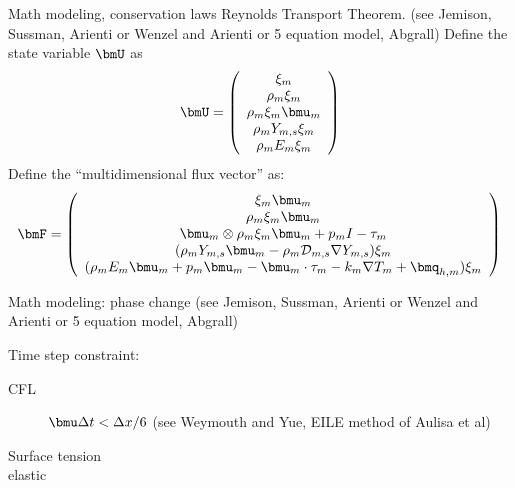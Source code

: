 \documentclass{beamer}
\begin{document}
\begin{frame}{Math modeling, conservation laws}
	Reynolds Transport Theorem.
(see Jemison, Sussman, Arienti or Wenzel and Arienti or 5 equation model,
	Abgrall)
Define the state variable $\bmU$ as
\begin{eqnarray}
	\bmU=\left( \begin{array}{c}
		\xi_{m} \\ \rho_{m}\xi_{m} \\ \rho_{m}\xi_{m}\bmu_{m} \\
		\rho_{m}Y_{m,s}\xi_{m} \\
	\rho_{m}E_{m}\xi_{m} \end{array} \right)
\end{eqnarray}
Define the ``multidimensional flux vector'' as:
\begin{eqnarray}
	\bmF=\left( \begin{array}{c}
	\xi_{m}\bmu_{m} \\
	\rho_{m}\xi_{m}\bmu_{m} \\
	\bmu_{m}\otimes\rho_{m}\xi_{m}\bmu_{m}+p_{m}I-\tau_{m} \\
	(\rho_{m}Y_{m,s}\bmu_{m}-\rho_{m}{\cal D}_{m,s}\nabla Y_{m,s})\xi_{m} \\
		(\rho_{m}E_{m}\bmu_{m}+p_{m}\bmu_{m}-\bmu_{m}\cdot \tau_{m}-
		k_{m}\nabla T_{m}+\bmq_{h,m})\xi_{m}
	\end{array} \right)
\end{eqnarray}

\end{frame}

\begin{frame}{Math modeling: phase change}
(see Jemison, Sussman, Arienti or Wenzel and Arienti or 5 equation model,
	Abgrall)

\end{frame}

Time step constraint:
\begin{description}
\item[CFL] $\bmu \Delta t < \Delta x/6$ (see Weymouth and Yue, EILE method of
Aulisa et al)
\item[Surface tension]
\item[elastic]
\end{description}
\end{document}
